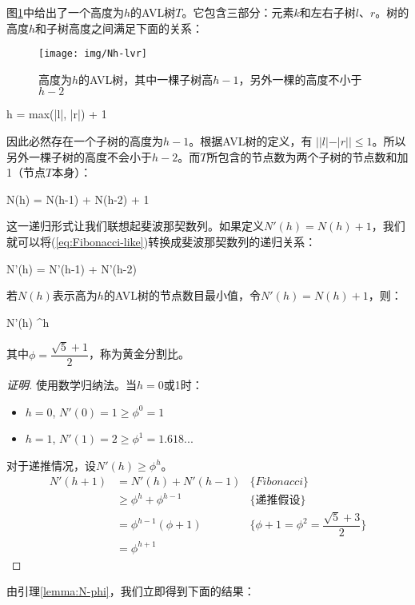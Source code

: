 \documentclass[b5paper]{ctexart}
\begin{document}
图\ref{fig:N-h-relation}中给出了一个高度为$h$的AVL树$T$。它包含三部分：元素$k$和左右子树$l$、$r$。树的高度$h$和子树高度之间满足下面的关系：

\begin{figure}[htbp]
   \centering
   \texttt{[image: img/Nh-lvr]}
   \caption{高度为$h$的AVL树，其中一棵子树高$h - 1$，另外一棵的高度不小于$h - 2$}
   \label{fig:N-h-relation}
\end{figure}

\be
  h = max(|l|, |r|) + 1
\ee

因此必然存在一个子树的高度为$h - 1$。根据AVL树的定义，有 $||l| -|r|| \leq 1$。所以另外一棵子树的高度不会小于$h - 2$。而$T$所包含的节点数为两个子树的节点数和加1（节点$T$本身）：

\be
  N(h) = N(h-1) + N(h-2) + 1
  \label{eq:Fibonacci-like}
\ee

这一递归形式让我们联想起斐波那契数列。如果定义$N'(h) = N(h) + 1$，我们就可以将(\ref{eq:Fibonacci-like})转换成斐波那契数列的递归关系：

\be
  N'(h) = N'(h-1) + N'(h-2)
\ee

\begin{lemma}
\label{lemma:N-phi}
若$N(h)$表示高为$h$的AVL树的节点数目最小值，令$N'(h) = N(h) + 1$，则：

\be
  N'(h) \geq \phi^h
\ee

其中$\phi = \dfrac{\sqrt{5}+1}{2}$，称为黄金分割比。
\end{lemma}

\begin{proof}[证明]
使用数学归纳法。当$h = 0$或1时：
\begin{itemize}
\item $h = 0$, $N'(0) = 1 \geq \phi^0 = 1$
\item $h = 1$, $N'(1) = 2 \geq \phi^1 = 1.618...$
\end{itemize}

对于递推情况，设$N'(h) \geq \phi^h$。
\[
  \begin{array}{lll}
  N'(h+1) & = N'(h) + N'(h-1) & \{Fibonacci\} \\
          & \geq \phi^h + \phi^{h-1} & \{\text{递推假设}\}\\
          & = \phi^{h-1}(\phi + 1) & \{\phi + 1 = \phi^2 = \dfrac{\sqrt{5}+3}{2}\} \\
          & = \phi^{h+1}
 \end{array}
\]
\end{proof}

由引理\ref{lemma:N-phi}，我们立即得到下面的结果：
\end{document}

